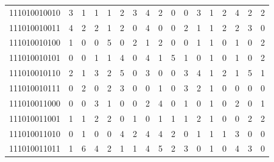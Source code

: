 \documentclass[10pt,a4paper]{article}
\begin{document}
\begin{longtable}{ |c|c|c|c|c|c|c|c|c|c|c|c|c|c|c|c|c| }
    111010010010              & 3                            & 1                                & 1                            & 1                              & 2   & 3   & 4   & 2   & 0   & 0   & 3   & 1   & 2   & 4   & 2   & 2   \\
    111010010011              & 4                            & 2                                & 2                            & 1                              & 2   & 0   & 4   & 0   & 0   & 2   & 1   & 1   & 2   & 2   & 3   & 0   \\
    111010010100              & 1                            & 0                                & 0                            & 5                              & 0   & 2   & 1   & 2   & 0   & 0   & 1   & 1   & 0   & 1   & 0   & 2   \\
    111010010101              & 0                            & 0                                & 1                            & 1                              & 4   & 0   & 4   & 1   & 5   & 1   & 0   & 1   & 0   & 1   & 0   & 2   \\
    111010010110              & 2                            & 1                                & 3                            & 2                              & 5   & 0   & 3   & 0   & 0   & 3   & 4   & 1   & 2   & 1   & 5   & 1   \\
    111010010111              & 0                            & 2                                & 0                            & 2                              & 3   & 0   & 0   & 1   & 0   & 3   & 2   & 1   & 0   & 0   & 0   & 0   \\
    111010011000              & 0                            & 0                                & 3                            & 1                              & 0   & 0   & 2   & 4   & 0   & 1   & 0   & 1   & 0   & 2   & 0   & 1   \\
    111010011001              & 1                            & 1                                & 2                            & 2                              & 0   & 1   & 0   & 1   & 1   & 1   & 2   & 1   & 0   & 0   & 2   & 2   \\
    111010011010              & 0                            & 1                                & 0                            & 0                              & 4   & 2   & 4   & 4   & 2   & 0   & 1   & 1   & 1   & 3   & 0   & 0   \\
    111010011011              & 1                            & 6                                & 4                            & 2                              & 1   & 1   & 4   & 5   & 2   & 3   & 0   & 1   & 0   & 4   & 3   & 0   \\

\end{longtable}
\end{document}
